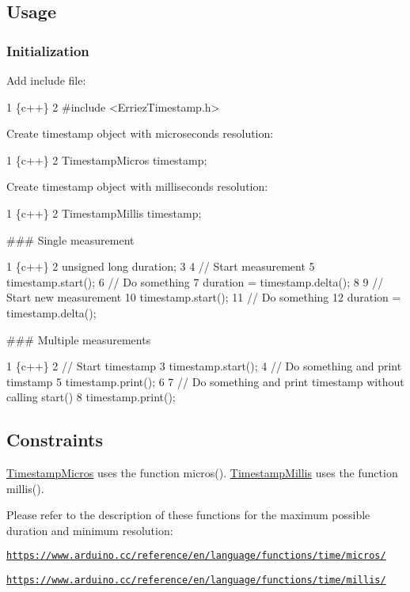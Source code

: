 \subsection*{Usage}

\subsubsection*{Initialization}

Add include file\+: 
\begin{DoxyCode}
1 \{c++\}
2 #include <ErriezTimestamp.h>
\end{DoxyCode}


Create timestamp object with microseconds resolution\+: 
\begin{DoxyCode}
1 \{c++\}
2 TimestampMicros timestamp;
\end{DoxyCode}


Create timestamp object with milliseconds resolution\+: 
\begin{DoxyCode}
1 \{c++\}
2 TimestampMillis timestamp;
\end{DoxyCode}


\#\#\# Single measurement 
\begin{DoxyCode}
1 \{c++\}
2 unsigned long duration;
3 
4 // Start measurement
5 timestamp.start();
6 // Do something
7 duration = timestamp.delta();
8 
9 // Start new measurement
10 timestamp.start();
11 // Do something
12 duration = timestamp.delta();
\end{DoxyCode}


\#\#\# Multiple measurements 
\begin{DoxyCode}
1 \{c++\}
2 // Start timestamp
3 timestamp.start();
4 // Do something and print timstamp
5 timestamp.print();
6 
7 // Do something and print timestamp without calling start()
8 timestamp.print();
\end{DoxyCode}


\subsection*{Constraints}

\hyperlink{class_timestamp_micros}{Timestamp\+Micros} uses the function {\ttfamily micros()}. \hyperlink{class_timestamp_millis}{Timestamp\+Millis} uses the function millis().

Please refer to the description of these functions for the maximum possible duration and minimum resolution\+:


\begin{DoxyItemize}
\item \href{https://www.arduino.cc/reference/en/language/functions/time/micros/}{\tt https\+://www.\+arduino.\+cc/reference/en/language/functions/time/micros/}
\item \href{https://www.arduino.cc/reference/en/language/functions/time/millis/}{\tt https\+://www.\+arduino.\+cc/reference/en/language/functions/time/millis/}
\end{DoxyItemize}

